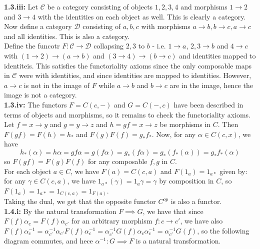 \documentclass[a4paper]{article}
\begin{document}
    \textbf{1.3.iii:} Let $\mathcal{C}$ be a category consisting of
    objects $1,2,3,4$ and morphisms $1\to 2$ and $3\to 4$ with the identities
    on each object as well. This is clearly a category.\\
    Now define a category $\mathcal{D}$ consisting of $a,b,c$ with
    morphisms $a\to b, b\to c, a\to c$ and all identities. This is also
    a category.\\
    Define the funcotr $F  \colon \mathcal{C} \to \mathcal{D}$ collapsing
    $2,3$ to $b$ - i.e. $1 \to a$, $2,3 \to b$ and $4 \to c$ with
    $\left( 1\to 2 \right)  \to (a\to b)$ and
    $(3\to 4) \to ( b\to c)$ and identities mapped to identiteis.
    This satisfies the functoriality axioms since
    the only composable maps in $\mathcal{C}$ were with identities, and
    since identities are mapped to identities. However,
    $a\to c$ is not in the image of $F$ while $a\to b$ and $b\to c$ are in the
    image, hence the image is not a category.\\
    \linebreak
    \textbf{1.3.iv:} The functors $F=C \left( c, - \right) $ and
    $G=C\left( -, c \right) $ have been described
    in terms of objects and morphisms, so it remains to check the functoriality
    axioms.\\
    Let $f = x \to y$ and $g= y \to z$ and $h = gf = x \to z$ be morphisms in $C$. Then
    $F(gf) = F\left( h \right) = h_*$ and $F(g) F(f) = g_* f_*$.
    Now, for any  $\alpha \in C\left( c, x \right) $, we have
    \[
    h_* \left( \alpha \right) = h \alpha = gf \alpha = g\left( f \alpha \right) 
    =g_* \left( f \alpha \right) 
    = g_* \left( f_* \left( \alpha \right)  \right) 
    = g_* f_* \left( \alpha \right) 
    \] 
    so $F(gf) = F(g) F(f)$ for any composable $f,g$ in $C$.\\
    For each object  $a \in C$, we have
    $F(a) = C(c,a)$ and
    $F(1_{a}) = 1_{a*}$ given by: for any $\gamma \in C(c,a)$, we have
    $1_{a*}(\gamma) = 1_{a}\gamma = \gamma$ by composition in $C$, so $
    F(1_a) = 1_{a*}= 
    1_{C \left( c,a \right) } = 1_{F(a)}$.\\
    \linebreak
    Taking the dual, we get that the opposite functor
    $C^{op}$ is also a functor.\\
    \linebreak
    \textbf{1.4.i:} By the natural transformation $F \implies G$, we have
    that since $F(f) \alpha_c = F(f) \alpha_{c'}$ for an arbitrary morphism $f
     \colon c \to c'$, we have also
    $F(f) \alpha_c^{-1} =
    \alpha_{c'}^{-1} \alpha_{c'}F(f) \alpha_{c}^{-1}
    = \alpha_{c'}^{-1}G(f) \alpha_{c}\alpha_{c}^{-1}
    = \alpha_{c'}^{-1}G(f)$, so the following diagram commutes, and hece
    $\alpha^{-1}  \colon G \implies F$ is a natural transformation.
\end{document}
